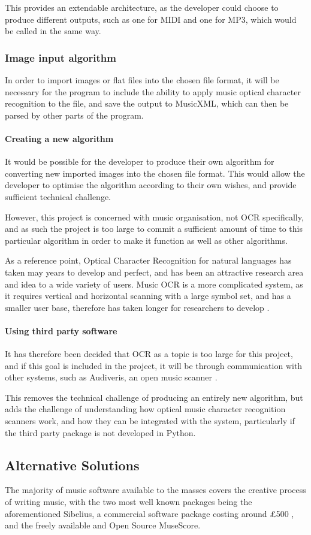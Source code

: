 This provides an extendable architecture, as the developer could choose to produce different outputs, such as one for MIDI and one for MP3, which would be called in the same way.
\subsubsection{Image input algorithm}
In order to import images or flat files into the chosen file format, it will be necessary for the program to include the ability to apply music optical character recognition to the file, and save the output to MusicXML, which can then be parsed by other parts of the program. 

\paragraph{Creating a new algorithm}
It would be possible for the developer to produce their own algorithm for converting new imported images into the chosen file format. This would allow the developer to optimise the algorithm according to their own wishes, and provide sufficient technical challenge.

However, this project is concerned with music organisation, not OCR specifically, and as such the project is too large to commit a sufficient amount of time to this particular algorithm in order to make it function as well as other algorithms. 

As a reference point, Optical Character Recognition for natural languages has taken may years to develop and perfect, and has been an attractive research area and idea to a wide variety of users\parencite{InternationalConf}. Music OCR is a more complicated system, as it requires vertical and horizontal scanning with a large symbol set, and has a smaller user base, therefore has taken longer for researchers to develop \parencite{musicocr}. 

\paragraph{Using third party software}
It has therefore been decided that OCR as a topic is too large for this project, and if this goal is included in the project, it will be through communication with other systems, such as Audiveris, an open music scanner \parencite{audiveris}. 

This removes the technical challenge of producing an entirely new algorithm, but adds the challenge of understanding how optical music character recognition scanners work, and how they can be integrated with the system, particularly if the third party package is not developed in Python.
\subsection{Alternative Solutions}
The majority of music software available to the masses covers the creative process of writing music, with the two most well known packages being the aforementioned Sibelius, a commercial software package costing around £500 \parencite{avid}, and the freely available and Open Source MuseScore\parencite{MuseTour}.